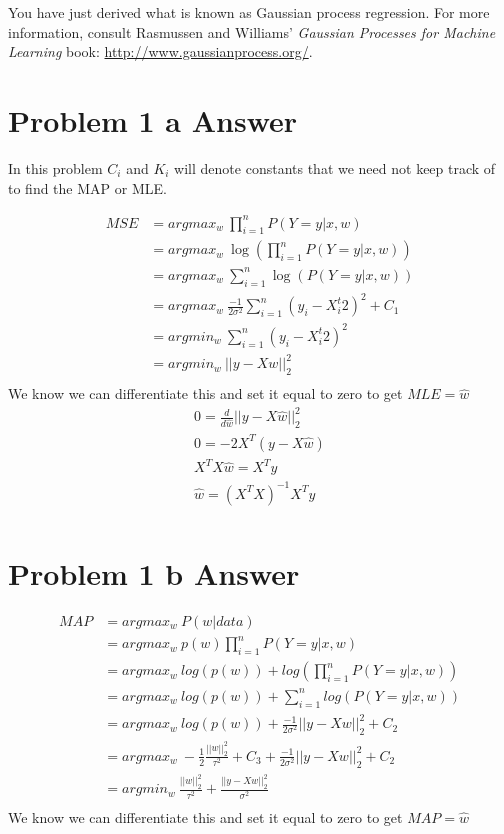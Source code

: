 \documentclass{article}
\newcommand{\1}{\mathbf{1}}
\begin{document}
You have just derived what is known as Gaussian process regression. 
For more information, consult Rasmussen and Williams' \textit{Gaussian Processes for Machine Learning} book: \url{http://www.gaussianprocess.org/}.\\ 

\newpage
\section*{Problem 1 a Answer}

In this problem $C_i$ and $K_i$ will denote constants that we need not keep track of to find  the MAP or MLE.

\begin{align}
    MSE & = argmax_w \  \prod_{i=1}^{n} P(Y=y | x, w) \\
    & = argmax_w \    \log( \prod_{i=1}^{n} P(Y=y | x, w) ) \\ 
    & = argmax_w \     \sum_{i=1}^{n}  \log(P(Y=y | x, w) ) \\
    & = argmax_w \    \frac{-1}{2\sigma^2} \sum_{i=1}^{n}  (y_i -X^t_i 2)^2  + C_1  \\
    & = argmin_w \   \sum_{i=1}^{n}  (y_i -X^t_i 2)^2   \\
    & = argmin_w \   || y - Xw ||^2_2   \\
\end{align}
We know we can differentiate this and set it equal to zero to get $MLE=\hat{w}$
\begin{align}
    0 = \frac{d}{d\hat{w}}   || y - X\hat{w} ||^2_2   \\
    0 = -2 X^T ( y - X \hat{w} )   \\
    X^T X \hat{w} =  X^T  y    \\
    \hat{w} = (X^T X)^{-1}  X^T  y    \\
\end{align}



\section*{Problem 1 b Answer}

\begin{align}
    MAP & = argmax_w \  P(w | data ) \\
    & = argmax_w \   p(w)  \prod_{i=1}^{n} P(Y=y | x, w)  \\ 
    & = argmax_w \  log( p(w) ) + log(   \prod_{i=1}^{n} P(Y=y | x, w)  )  \\
    & = argmax_w \  log( p(w) ) +   \sum_{i=1}^{n} log( P(Y=y | x, w)  )  \\ 
    & = argmax_w \  log( p(w) ) + \frac{-1}{2\sigma^2}  || y - Xw ||^2_2  + C_2  \\ 
    & = argmax_w \  -\frac{1}{2} \frac{||w||_2^2}{ \tau^2 } + C_3 + \frac{-1}{2\sigma^2}  || y - Xw ||^2_2  + C_2  \\ 
    & = argmin_w \  \frac{||w||_2^2}{ \tau^2 } +  \frac{|| y - Xw ||^2_2}{\sigma^2}    \\ 
\end{align}
We know we can differentiate this and set it equal to zero to get $MAP=\hat{w}$
\end{document}
